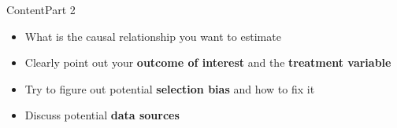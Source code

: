 \documentclass[hyperref={pdfpagelabels=false}]{beamer}
\begin{document}
\begin{frame}{Content}{Part 2}
	\begin{itemize} 
		
		\item What is the causal relationship you want to estimate
		\vspace{0.2cm}
		\item Clearly point out your \textbf{outcome of interest} and the \textbf{treatment variable}
		\vspace{0.2cm}
		\item Try to figure out potential \textbf{selection bias} and how to fix it
		\vspace{0.2cm}
		\item Discuss potential \textbf{data sources}
		
		
		
	\end{itemize}
\end{frame}
\end{document}
